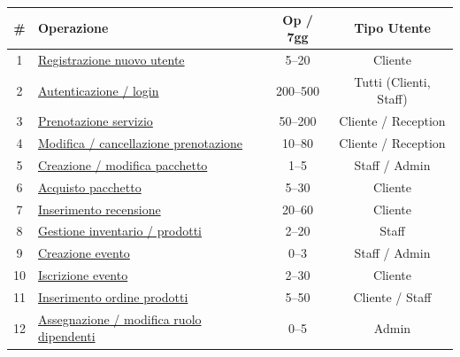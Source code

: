 \documentclass[a4paper,12pt]{report}
\begin{document}
\begin{table}[H]
	\centering
	\small
	\renewcommand{\arraystretch}{1.12}
	\begin{tabularx}{\textwidth}{|c|>{\raggedright\arraybackslash}X|c|c|}
		\hline
		\rowcolor{gray!20}
		\textbf{\#} & \textbf{Operazione}                                                    & \textbf{Op / 7gg} & \textbf{Tipo Utente}   \\
		\hline
		1           & \hyperref[op1]{Registrazione nuovo utente}                             & 5--20             & Cliente                \\
		\hline
		2           & \hyperref[op2]{Autenticazione / login}                                 & 200--500          & Tutti (Clienti, Staff) \\
		\hline
		3           & \hyperref[op3]{Prenotazione servizio}                                  & 50--200           & Cliente / Reception    \\
		\hline
		4           & \hyperref[op4]{Modifica / cancellazione prenotazione}                  & 10--80            & Cliente / Reception    \\
		\hline
		5           & \hyperref[op5]{Creazione / modifica pacchetto}                         & 1--5              & Staff / Admin          \\
		\hline
		6           & \hyperref[op6]{Acquisto pacchetto}                                     & 5--30             & Cliente                \\
		\hline
		7           & \hyperref[op7]{Inserimento recensione}                                 & 20--60            & Cliente                \\
		\hline
		8           & \hyperref[op8]{Gestione inventario / prodotti}                         & 2--20             & Staff                  \\
		\hline
		9           & \hyperref[op9]{Creazione evento}                                       & 0--3              & Staff / Admin          \\
		\hline
		10          & \hyperref[op10]{Iscrizione evento}                                     & 2--30             & Cliente                \\
		\hline
		11          & \hyperref[op11]{Inserimento ordine prodotti}                           & 5--50             & Cliente / Staff        \\
		\hline
		12          & \hyperref[op12]{Assegnazione / modifica ruolo dipendenti}              & 0--5              & Admin                  \\

\end{tabularx}
\end{table}
\end{document}
